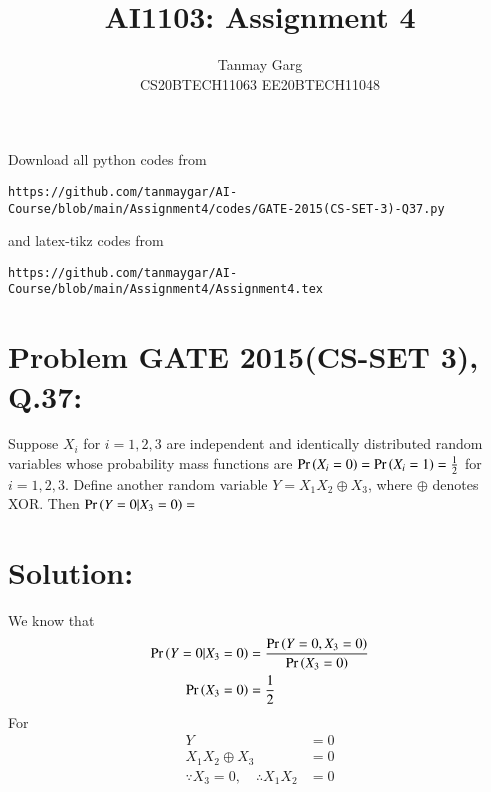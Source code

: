 \documentclass[journal,12pt,twocolumn]{IEEEtran}
\begin{document}
     \def\rightbox#1{\makebox[0in][r]{#1}}
     \def\centbox#1{\makebox[0in]{#1}}
     \def\topbox#1{\raisebox{-\baselineskip}[0in][0in]{#1}}
     \def\midbox#1{\raisebox{-0.5\baselineskip}[0in][0in]{#1}}
\vspace{3cm}
\title{AI1103: Assignment 4}
\author{Tanmay Garg \\CS20BTECH11063 EE20BTECH11048}
\maketitle
\newpage
\bigskip
\renewcommand{\thefigure}{\theenumi}
\renewcommand{\thetable}{\theenumi}
Download all python codes from 
\begin{lstlisting}
https://github.com/tanmaygar/AI-Course/blob/main/Assignment4/codes/GATE-2015(CS-SET-3)-Q37.py
\end{lstlisting}
%
and latex-tikz codes from 
%
\begin{lstlisting}
https://github.com/tanmaygar/AI-Course/blob/main/Assignment4/Assignment4.tex
\end{lstlisting}
\section*{Problem GATE 2015(CS-SET 3), Q.37: }
Suppose $X_i$ for $i = 1, 2, 3$ are independent
and identically distributed random variables
whose probability mass functions are
$\Pr\left(X_i = 0\right) = \Pr\left(X_i = 1\right) = \frac{1}{2}$ for $i = 1, 2, 3$.
Define another random variable $Y = X_1 X_2 \oplus X_3$, where $\oplus$ denotes XOR. Then $\Pr\left(Y = 0|X_3 = 0\right) =$

\section*{Solution:}
We know that
\begin{align}
    \Pr\left(Y=0|X_3=0\right) &= \dfrac{\Pr\left(Y=0,X_3=0\right)}{\Pr\left(X_3=0\right)} \label{eq:0.0.1}\\
    \Pr\left(X_3 = 0\right) &= \frac{1}{2} \label{eq:0.0.2}
\end{align}
For
\begin{align}
    Y &= 0\\
    X_1X_2 \oplus X_3 &= 0\\
    \because X_3 = 0,\quad \therefore X_1X_2 &= 0
\end{align}
\end{document}
